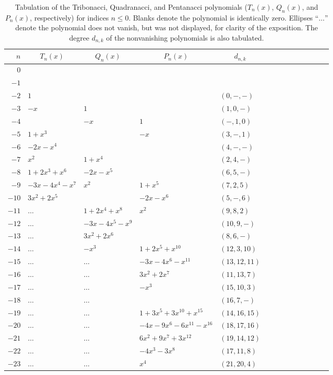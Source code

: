 \documentclass[review]{elsarticle}
\theoremstyle{plain}
\begin{document}
\newpage
\begin{table}[!htb]
\centering
{\begin{tabular}{|r|l|l|l|l|lllllllll}
  \hline
$n$ & \multicolumn{1}{c|}{$T_n(x)$} & \multicolumn{1}{c|}{$Q_n(x)$} & \multicolumn{1}{c|}{$P_n(x)$} & \multicolumn{1}{c|}{$d_{n,k}$} \\ \hline
$0$  &&&& \\
$-1$  &&&& \\ 
$-2$  & $1$      &                & & $(0,-,-)$  \\
$-3$  & $-x$     & $1$            & & $(1,0,-)$  \\
$-4$  &          & $-x$           & $1$ & $(-,1,0)$ \\
$-5$  & $1 +x^3$ &                & $-x$ & $(3,-,1)$ \\
$-6$  & $-2x -x^4$  &                & & $(4,-,-)$    \\
$-7$  & $x^2$  & $1+x^4$        & & $(2,4,-)$    \\
$-8$  & $1 +2x^3 +x^6$  & $-2x -x^5$     & & $(6,5,-)$ \\
$-9$  & $-3x -4x^4 -x^7$  & $x^2$          & $1+x^5$ & $(7,2,5)$ \\
$-10$ & $3x^2 +2x^5$  &                & $-2x-x^6$ & $(5,-,6)$ \\
$-11$ & $\dots$  & $1 +2x^4 +x^8$ & $x^2$ & $(9,8,2)$ \\
$-12$ & $\dots$ & $-3x -4x^5 -x^9$       & & $(10,9,-)$ \\
$-13$ & $\dots$ & $3x^2 +2x^6$ & & $(8,6,-)$ \\
$-14$ & $\dots$ & $-x^3$ & $1 +2x^5 +x^{10}$  & $(12,3,10)$ \\
$-15$ & $\dots$ & $\dots$        & $-3x -4x^6 -x^{11}$ & $(13,12,11)$ \\
$-16$ & $\dots$ & $\dots$        & $3x^2 +2x^7$ & $(11,13,7)$ \\
$-17$ & $\dots$ & $\dots$        & $-x^3$ & $(15,10,3)$ \\
$-18$ & $\dots$ & $\dots$        & & $(16,7,-)$ \\
$-19$ & $\dots$ & $\dots$        & $1 +3x^5 +3x^{10} +x^{15}$ & $(14,16,15)$ \\
$-20$ & $\dots$ & $\dots$        & $-4x -9x^6 -6x^{11} -x^{16}$ & $(18,17,16)$ \\
$-21$ & $\dots$ & $\dots$        & $6x^2 +9x^7 +3x^{12}$ & $(19,14,12)$ \\
$-22$ & $\dots$ & $\dots$        & $-4x^3 -3x^8$ & $(17,11,8)$ \\
$-23$ & $\dots$ & $\dots$        & $x^4$ & $(21,20,4)$  \\ \hline
\end{tabular}}
\caption{\label{tb:Fib_poly_neg} Tabulation of the Tribonacci, Quadranacci, and Pentanacci polynomials ($T_n(x)$, $Q_n(x)$, and $P_n(x)$, respectively) for indices $n\le0$.
  Blanks denote the polynomial is identically zero.
  Ellipses ``$\dots$'' denote the polynomial does not vanish, but was not displayed, for clarity of the exposition.
  The degree $d_{n,k}$ of the nonvanishing polynomials is also tabulated.}
\end{table}
\end{document}
